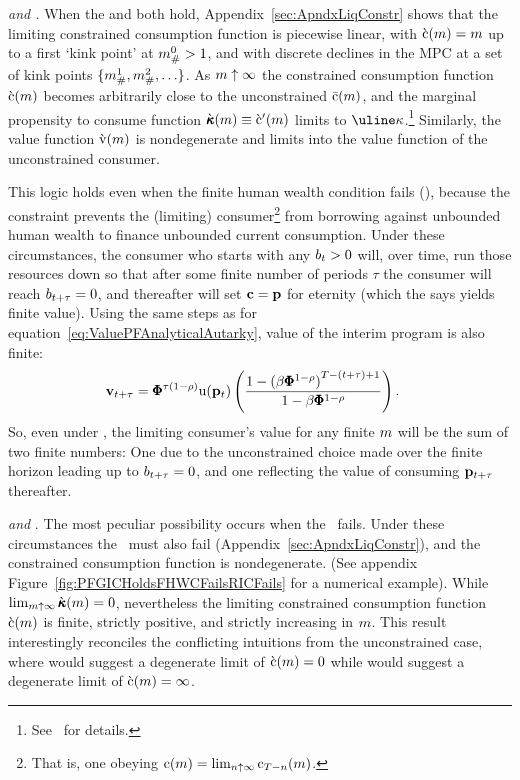 \documentclass[BufferStockTheory]{subfiles}
\begin{document}
\textit{{\GICRaw} and {\RIC}.}  When the {\RIC} and {\GICRaw} both hold, Appendix~\ref{sec:ApndxLiqConstr} shows that the limiting constrained consumption function is piecewise linear, with $\grave{\mathrm{c}}(m)=m$ up to a first `kink point' at $m_{\#}^{0}>1$, and with discrete declines in the MPC at a set of kink points $\{m_{\#}^{1},m_{\#}^{2},\ldots\}$.  As $m \uparrow \infty$ the constrained consumption function $\grave{\mathrm{c}}(m)$ becomes arbitrarily close to the unconstrained $\bar{\mathrm{c}}(m)$, and the marginal propensity to consume function $\grave{\pmb{\kappa}}(m) \equiv \grave{\mathrm{c}}^{\prime}(m)$ limits to $\MPCmin$.\footnote{See~\cite{chkLiqConstr} for details.}  Similarly, the value function $\grave{\mathrm{v}}(m)$ is nondegenerate and limits into the value function of the unconstrained consumer.

This logic holds even when the finite human wealth condition fails (\cncl{\FHWC}), because the constraint prevents the (limiting) consumer\footnote{That is, one obeying $\mathrm{c}(m) = \lim_{n \uparrow \infty} \mathrm{c}_{T-n}(m)$.} from borrowing against unbounded human wealth to finance unbounded current consumption.  Under these circumstances, the consumer who starts with any $b_{t} > 0$ will, over time, run those resources down so that after some finite number of periods $\tau$ the consumer will reach $b_{t+\tau} = 0$, and thereafter will set $\mathbf{c} = \mathbf{p}$ for eternity (which the {\PFFVAC} says yields finite value).  Using the same steps as for equation~\eqref{eq:ValuePFAnalyticalAutarky}, value of the interim program is also finite: \hypertarget{PFFVAC}{} \hypertarget{PFVAFacDefn}{}
\begin{align*}
  \mathbf{v}_{t+\tau} 
  & = \pmb{\Phi}^{\tau(1-{\rho})} \mathrm{u}(\mathbf{p}_{t})\left(\frac{1-{(\beta \pmb{\Phi}^{1-{\rho}})}^{T-(t+\tau)+1}}{1-\beta \pmb{\Phi}^{1-{\rho}}}\right).
\end{align*}
So, even under \cncl{\FHWC}, the limiting consumer's value for any finite $m$ will be the sum of two finite numbers: One due to the unconstrained choice made over the finite horizon leading up to $b_{t+\tau} = 0$, and one reflecting the value of consuming $\mathbf{p}_{t+\tau}$ thereafter.

\hypertarget{RICandFHWCFail}{} \textit{{\GICRaw} and {\cncl{\RIC}}}.  The most peculiar possibility occurs when the \RIC~fails.  Under these circumstances the \FHWC~must also fail (Appendix~\ref{sec:ApndxLiqConstr}), and the constrained consumption function is nondegenerate.  (See appendix Figure~\ref{fig:PFGICHoldsFHWCFailsRICFails} for a numerical example).  While $\lim_{m \uparrow \infty} \grave{\pmb{\kappa}}(m) = 0$, nevertheless the limiting constrained consumption function $\grave{\mathrm{c}}(m)$ is finite, strictly positive, and strictly increasing in $m$.  This result interestingly reconciles the conflicting intuitions from the unconstrained case, where \cncl{\RIC} would suggest a degenerate limit of $\grave{\mathrm{c}}(m)=0$ while \cncl{\FHWC} would suggest a degenerate limit of $\grave{\mathrm{c}}(m)=\infty$.
\end{document}
